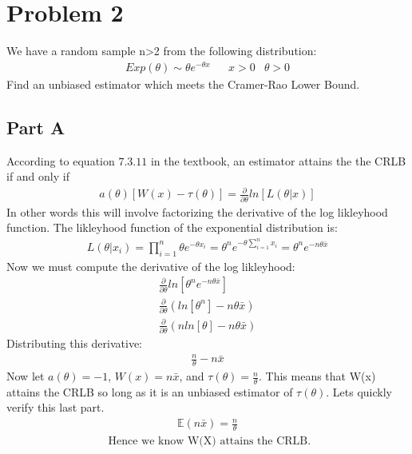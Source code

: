 \documentclass{article}
\begin{document}
\clearpage

\section*{Problem 2}
We have a random sample n>2 from the following distribution:
\begin{align*}
Exp(\theta) \sim \theta e^{-\theta x} && x>0 & \theta > 0
\end{align*}
Find an unbiased estimator which meets the Cramer-Rao Lower Bound.
\subsection*{Part A}
According to equation $7.3.11$ in the textbook, an estimator attains the the CRLB if and only if
\begin{align*}
a(\theta)[W(x) - \tau(\theta)] = \frac{\partial}{\partial \theta} ln[L(\theta|x)]
\end{align*}
In other words this will involve factorizing the derivative of the log likleyhood function. The likleyhood function of the exponential distribution is:
\begin{align*}
L(\theta|x_i) = \prod_{i=1}^{n} \theta e^{-\theta x_i} = \theta^n e^{-\theta \sum_{i=1}^{n} x_i} = \theta^n e^{-n \theta \bar{x}}
\end{align*}
Now we must compute the derivative of the log likleyhood:
\begin{align*}
\frac{\partial}{\partial \theta} ln[\theta^n e^{-n \theta \bar{x}}] \\
\frac{\partial}{\partial \theta} ( ln[\theta^n] - n \theta \bar{x} ) \\
\frac{\partial}{\partial \theta} ( n ln[\theta] - n \theta \bar{x} )
\end{align*}
Distributing this derivative:
\begin{align*}
\frac{n}{\theta} - n \bar{x}
\end{align*}
Now let $a(\theta)=-1$, $W(x)= n \bar{x}$, and $\tau(\theta)= \frac{n}{\theta}$. This means that W(x) attains the CRLB so long as it is an unbiased estimator of $\tau(\theta)$. Lets quickly verify this last part.
\begin{align*}
\mathbb{E}(n \bar{x}) = \frac{n}{\theta}
\end{align*}
\begin{align*}
\boxed{ \text{ Hence we know W(X) attains the CRLB.} }
\end{align*}


\clearpage
\end{document}
